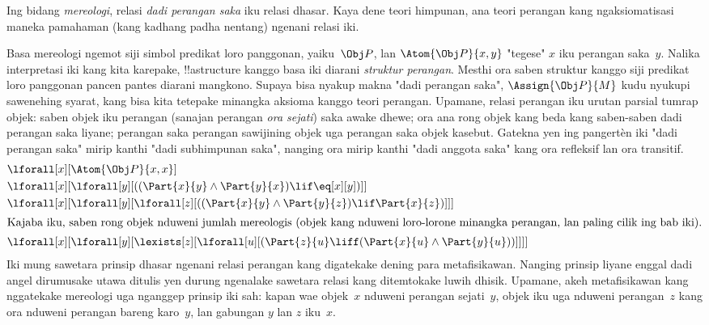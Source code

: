 \documentclass[../../../include/open-logic-section]{subfiles}
\begin{document}
\begin{ex}
Ing bidang \emph{mereologi}, relasi \emph{dadi perangan saka}
iku relasi dhasar. Kaya dene teori himpunan, ana teori
perangan kang ngaksiomatisasi maneka pamahaman
(kang kadhang padha nentang) ngenani relasi iki.

Basa mereologi ngemot siji simbol predikat loro panggonan,
yaiku~$\Obj P$, lan $\Atom{\Obj P}{x, y}$ "tegese" $x$
iku perangan saka~$y$. Nalika interpretasi iki kang kita
karepake, !!a{structure} kanggo basa iki diarani
\emph{struktur perangan}. Mesthi ora saben struktur
kanggo siji predikat loro panggonan pancen pantes
diarani mangkono. Supaya bisa nyakup makna
"dadi perangan saka", $\Assign{\Obj P}{M}$ kudu
nyukupi sawenehing syarat, kang bisa kita tetepake
minangka aksioma kanggo teori perangan. Upamane,
relasi perangan iku urutan parsial tumrap objek:
saben objek iku perangan (sanajan perangan
\emph{ora sejati}) saka awake dhewe; ora ana rong
objek kang beda kang saben-saben dadi perangan
saka liyane; perangan saka perangan sawijining
objek uga perangan saka objek kasebut. Gatekna
yen ing pangertèn iki "dadi perangan saka" mirip
kanthi "dadi subhimpunan saka", nanging ora mirip
kanthi "dadi anggota saka" kang ora refleksif
lan ora transitif.
\begin{align*}
& \lforall[x][\Atom{\Obj P}{x,x}] \\
& \lforall[x][\lforall[y][((\Part{x}{y} \land \Part{y}{x})
      \lif \eq[x][y])]] \\
& \lforall[x][\lforall[y][\lforall[z][((\Part{x}{y} \land
        \Part{y}{z}) \lif \Part{x}{z})]]]\\
\intertext{Kajaba iku, saben rong objek nduweni jumlah mereologis (objek kang
  nduweni loro-lorone minangka perangan, lan paling cilik ing bab iki).}  &
\lforall[x][\lforall[y][\lexists[z][\lforall[u][(\Part{z}{u} \liff
        (\Part{x}{u} \land \Part{y}{u}))]]]]
\end{align*}
Iki mung sawetara prinsip dhasar ngenani relasi
perangan kang digatekake dening para metafisikawan.
Nanging prinsip liyane enggal dadi angel dirumusake
utawa ditulis yen durung ngenalake sawetara relasi
kang ditemtokake luwih dhisik. Upamane, akeh
metafisikawan kang nggatekake mereologi uga
nganggep prinsip iki sah: kapan wae objek~$x$
nduweni perangan sejati~$y$, objek iku uga nduweni
perangan~$z$ kang ora nduweni perangan bareng
karo~$y$, lan gabungan $y$ lan $z$ iku~$x$.
\end{ex}
\end{document}
